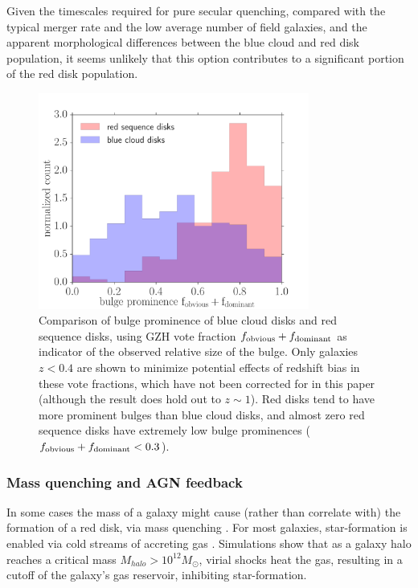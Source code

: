 \documentclass[useAMS,usenatbib]{mn2e}
\begin{document}
Given the timescales required for pure secular quenching, compared with the typical merger rate and the low average number of field galaxies, and the apparent morphological differences between the blue cloud and red disk population, it seems unlikely that this option contributes to a significant portion of the red disk population.  

\begin{figure}
\centering
\includegraphics[width=3.5in]{figures/bulge_comparison.pdf}
\caption{Comparison of bulge prominence of blue cloud disks and red sequence disks, using GZH vote fraction $f_{\rm obvious} + f_{\rm dominant}$ as indicator of the observed relative size of the bulge. Only galaxies $z<0.4$ are shown to minimize potential effects of redshift bias in these vote fractions, which have not been corrected for in this paper (although the result does hold out to $z\sim1$). Red disks tend to have more prominent bulges than blue cloud disks, and almost zero red sequence disks have extremely low bulge prominences ($f_{\rm obvious} + f _{\rm dominant} < 0.3$).}
\label{fig:bulge}
\end{figure}
  
\subsubsection{Mass quenching and AGN feedback}
In some cases the mass of a galaxy might cause (rather than correlate with) the formation of a red disk, via mass quenching \citep{Kormendy2004,Peng2010,Schawinski2014,Smethurst2017}. For most galaxies, star-formation is enabled via cold streams of accreting gas \citet{Dekel2006}. Simulations \citep{Birnboim2003,Cattaneo2006} show that as a galaxy halo reaches a critical mass $M_{halo}>10^{12}M_{\odot}$, virial shocks heat the gas, resulting in a cutoff of the galaxy's gas reservoir, inhibiting star-formation. 
\end{document}

